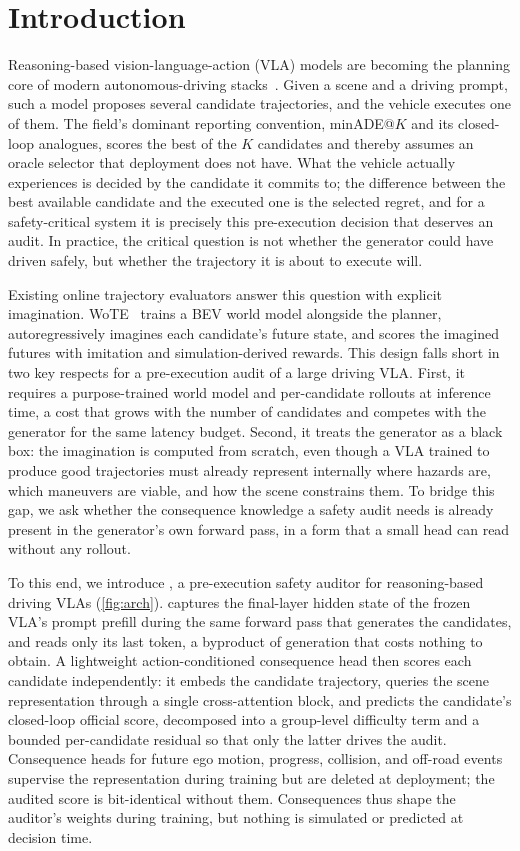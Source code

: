 \section{Introduction}
\label{sec:intro}

Reasoning-based vision-language-action (VLA) models are becoming the planning core of modern autonomous-driving stacks~\cite{tian2024drivevlm,hwang2024emma,alpamayo2025}.
Given a scene and a driving prompt, such a model proposes several candidate trajectories, and the vehicle executes one of them.
The field's dominant reporting convention, minADE@$K$ and its closed-loop analogues, scores the best of the $K$ candidates and thereby assumes an oracle selector that deployment does not have.
What the vehicle actually experiences is decided by the candidate it commits to; the difference between the best available candidate and the executed one is the selected regret, and for a safety-critical system it is precisely this pre-execution decision that deserves an audit.
In practice, the critical question is not whether the generator could have driven safely, but whether the trajectory it is about to execute will.

Existing online trajectory evaluators answer this question with explicit imagination.
WoTE~\cite{li2025wote} trains a BEV world model alongside the planner, autoregressively imagines each candidate's future state, and scores the imagined futures with imitation and simulation-derived rewards.
This design falls short in two key respects for a pre-execution audit of a large driving VLA.
First, it requires a purpose-trained world model and per-candidate rollouts at inference time, a cost that grows with the number of candidates and competes with the generator for the same latency budget.
Second, it treats the generator as a black box: the imagination is computed from scratch, even though a VLA trained to produce good trajectories must already represent internally where hazards are, which maneuvers are viable, and how the scene constrains them.
To bridge this gap, we ask whether the consequence knowledge a safety audit needs is already present in the generator's own forward pass, in a form that a small head can read without any rollout.

To this end, we introduce \headname{}, a pre-execution safety auditor for reasoning-based driving VLAs (\cref{fig:arch}).
\headname{} captures the final-layer hidden state of the frozen VLA's prompt prefill during the same forward pass that generates the candidates, and reads only its last token, a byproduct of generation that costs nothing to obtain.
A lightweight action-conditioned consequence head then scores each candidate independently: it embeds the candidate trajectory, queries the scene representation through a single cross-attention block, and predicts the candidate's closed-loop official score, decomposed into a group-level difficulty term and a bounded per-candidate residual so that only the latter drives the audit.
Consequence heads for future ego motion, progress, collision, and off-road events supervise the representation during training but are deleted at deployment; the audited score is bit-identical without them.
Consequences thus shape the auditor's weights during training, but nothing is simulated or predicted at decision time.

